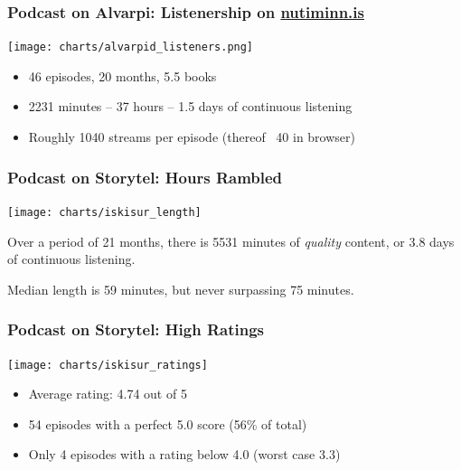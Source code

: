 \documentclass{beamer}
\begin{document}
    \begin{frame}
        \frametitle{Podcast on Alvarpi\dh{}: Listenership on \url{nutiminn.is}}
        \texttt{[image: charts/alvarpid\_listeners.png]}

        \begin{itemize}
            \item 46 episodes, 20 months, 5.5 books
            \item 2231 minutes -- 37 hours -- 1.5 days of continuous listening
            \item Roughly 1040 streams per episode (thereof ~40 in browser)
        \end{itemize}

    \end{frame}


    \begin{frame}
        \frametitle{Podcast on Storytel: Hours Rambled}
        \texttt{[image: charts/iskisur\_length]}

        Over a period of 21 months, there is 5531 minutes of \emph{quality} content, or 3.8 days of continuous
        listening.

        Median length is 59 minutes, but never surpassing 75 minutes.

    \end{frame}

    \begin{frame}
        \frametitle{Podcast on Storytel: High Ratings}
        \texttt{[image: charts/iskisur\_ratings]}
        \begin{itemize}
            \item Average rating: 4.74 out of 5
            \item 54 episodes with a perfect 5.0 score (56\% of total)
            \item Only 4 episodes with a rating below 4.0 (worst case 3.3)
        \end{itemize}
    \end{frame}
\end{document}

